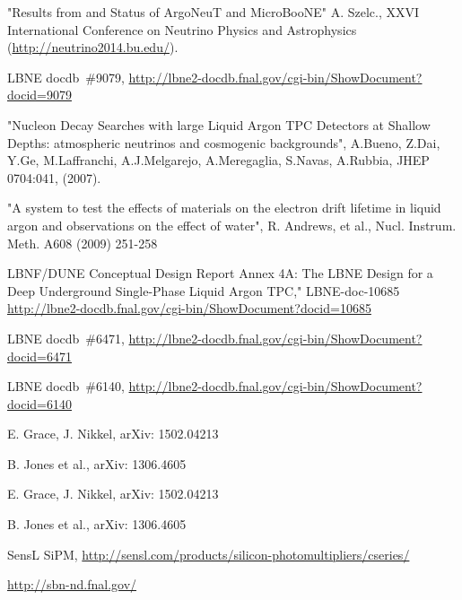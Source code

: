 \begin{thebibliography}{99}
 "Results from and Status of ArgoNeuT and MicroBooNE" A. Szelc., XXVI International Conference on Neutrino Physics and Astrophysics (\url{http://neutrino2014.bu.edu/}).

 LBNE docdb~\#9079, \url{http://lbne2-docdb.fnal.gov/cgi-bin/ShowDocument?docid=9079}

 "Nucleon Decay Searches with large Liquid Argon TPC Detectors at Shallow Depths: atmospheric neutrinos and cosmogenic backgrounds", A.Bueno, Z.Dai, Y.Ge, M.Laffranchi, A.J.Melgarejo, A.Meregaglia, S.Navas, A.Rubbia, JHEP 0704:041, (2007).

%
%
 "A system to test the effects of materials on the electron drift lifetime in liquid argon and observations on the effect of water", R. Andrews, et al., Nucl. Instrum. Meth. A608 (2009) 251-258

 LBNF/DUNE Conceptual Design Report Annex 4A: The LBNE Design for a Deep Underground Single-Phase Liquid Argon TPC," LBNE-doc-10685 \url{http://lbne2-docdb.fnal.gov/cgi-bin/ShowDocument?docid=10685}

 LBNE docdb~\#6471, \url{http://lbne2-docdb.fnal.gov/cgi-bin/ShowDocument?docid=6471}

 LBNE docdb~\#6140, \url{http://lbne2-docdb.fnal.gov/cgi-bin/ShowDocument?docid=6140}




 E. Grace, J. Nikkel,  arXiv: 1502.04213

 B. Jones et al., arXiv: 1306.4605


 E. Grace, J. Nikkel,  arXiv: 1502.04213

 B. Jones et al., arXiv: 1306.4605


 SensL SiPM, \url{http://sensl.com/products/silicon-photomultipliers/cseries/}


%
%

 \url{http://sbn-nd.fnal.gov/}



\end{thebibliography}
